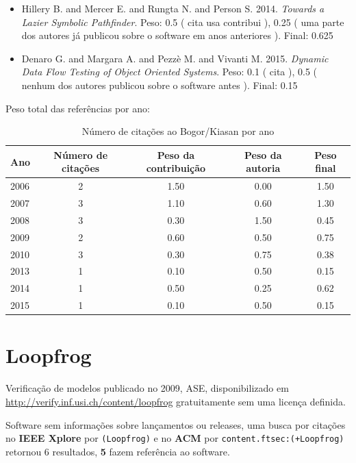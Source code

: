 \begin{itemize}
\item Hillery B. and Mercer E. and Rungta N. and Person S.
      2014.
        \textit{ Towards a Lazier Symbolic Pathfinder}.
      Peso:
      0.5 (
          cita
          usa
          contribui
      ),
      0.25 (
uma parte dos autores já publicou sobre o software em anos anteriores
      ).
      Final:
      0.625

\item Denaro G. and Margara A. and Pezz\`{e} M. and Vivanti M.
      2015.
        \textit{ Dynamic Data Flow Testing of Object Oriented Systems}.
      Peso:
      0.1 (
          cita
      ),
      0.5 (
nenhum dos autores publicou sobre o software antes
      ).
      Final:
      0.15

\end{itemize}

Peso total das referências por ano:

\begin{table}[h]
\caption{Número de citações ao Bogor/Kiasan por ano}
\centering
\begin{tabular}{| l | c | c | c | c |}
  \hline
  Ano & Número de citações & Peso da contribuição & Peso da autoria & Peso final \\
  \hline
  2006
    & 2
    & 1.50
    & 0.00
    & 1.50 \\
  2007
    & 3
    & 1.10
    & 0.60
    & 1.30 \\
  2008
    & 3
    & 0.30
    & 1.50
    & 0.45 \\
  2009
    & 2
    & 0.60
    & 0.50
    & 0.75 \\
  2010
    & 3
    & 0.30
    & 0.75
    & 0.38 \\
  2013
    & 1
    & 0.10
    & 0.50
    & 0.15 \\
  2014
    & 1
    & 0.50
    & 0.25
    & 0.62 \\
  2015
    & 1
    & 0.10
    & 0.50
    & 0.15 \\
  \hline
\end{tabular}
\end{table}


\section{Loopfrog}

Verificação de modelos
publicado no 2009, ASE,
disponibilizado em \url{http://verify.inf.usi.ch/content/loopfrog}
gratuitamente
sem uma licença definida.

Software sem informações sobre lançamentos ou releases,
uma busca por citações no {\bf IEEE Xplore} por
\texttt{(Loopfrog)}
e no {\bf ACM} por
\texttt{content.ftsec:(+Loopfrog)}
retornou
6 resultados,
{\bf 5} fazem referência ao software.

